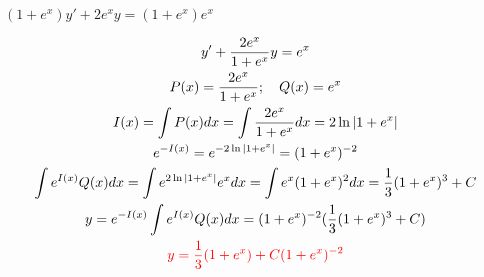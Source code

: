 \item [7.] $(1 + e^x)y' + 2e^xy = (1 + e^x)e^x$

\textcolor{blue}{
    \begin{gather*}
        y' + \frac{2e^x}{1 + e^x}y = e^x\\
        P(x)=\frac{2e^x}{1 + e^x}; \quad Q(x)=e^x\\
        I(x)=\int P(x)dx = \int \frac{2e^x}{1 + e^x}dx=2\ln|1+e^x|\\
        e^{-I(x)}=e^{-2\ln|1+e^x|}=(1+e^x)^{-2}\\
        \int e^{I(x)}Q(x)dx=\int e^{2\ln|1+e^x|}e^{x}dx=\int e^x(1+e^x)^{2}dx=\frac{1}{3}(1+e^x)^{3}+C\\
        y=e^{-I(x)}\int e^{I(x)}Q(x)dx=(1+e^x)^{-2}(\frac{1}{3}(1+e^x)^{3}+C)\\
        \textcolor{red}{
        y=\frac{1}{3}(1+e^x)+C(1+e^x)^{-2}
        }
    \end{gather*}
}